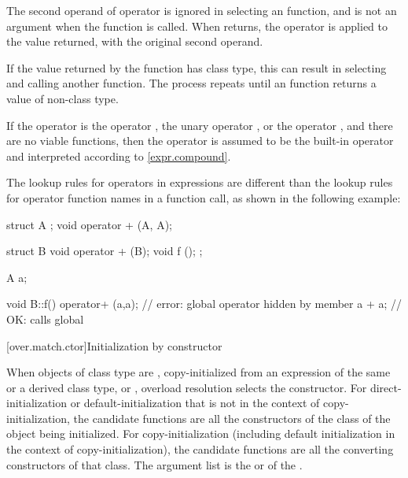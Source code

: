 \pnum
The second operand of operator
\tcode{->}
is ignored in selecting an
function, and is not an argument when the
function is called.
When
returns, the operator
\tcode{->}
is applied to the value returned, with the original second
operand.
\begin{footnote}
If the value returned by the
function has class type, this can result in selecting and calling another
function.
The process repeats until an
function returns a value of non-class type.
\end{footnote}

\pnum
If the operator is the operator
\tcode{,},
the unary operator
\tcode{\&},
or the operator
\tcode{->},
and there are no viable functions, then the operator is
assumed to be the built-in operator and interpreted according to
\ref{expr.compound}.

\pnum
\begin{note}
The lookup rules for operators in expressions are different than
the lookup
rules for operator function names in a function call, as shown in the following
example:
\begin{codeblock}
struct A { };
void operator + (A, A);

struct B {
  void operator + (B);
  void f ();
};

A a;

void B::f() {
  operator+ (a,a);              // error: global operator hidden by member
  a + a;                        // OK: calls global 
}
\end{codeblock}
\end{note}

[over.match.ctor]{Initialization by constructor}%

\pnum
When objects of class type are ,
copy-initialized from an expression of the same or a
derived class type,
or ,
overload resolution selects the constructor.
For direct-initialization or default-initialization
that is not in the context of copy-initialization, the
candidate functions are
all the constructors of the class of the object being
initialized.
For copy-initialization (including default initialization
in the context of copy-initialization), the candidate functions are all
the converting constructors of that
class.
The argument list is the
 or 
of the .

